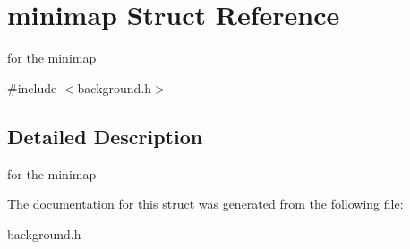 \hypertarget{structminimap}{}\section{minimap Struct Reference}
\label{structminimap}


for the minimap  




{\ttfamily \#include $<$background.\+h$>$}



\subsection{Detailed Description}
for the minimap 

The documentation for this struct was generated from the following file\+:\begin{DoxyCompactItemize}
\item 
background.\+h\end{DoxyCompactItemize}
